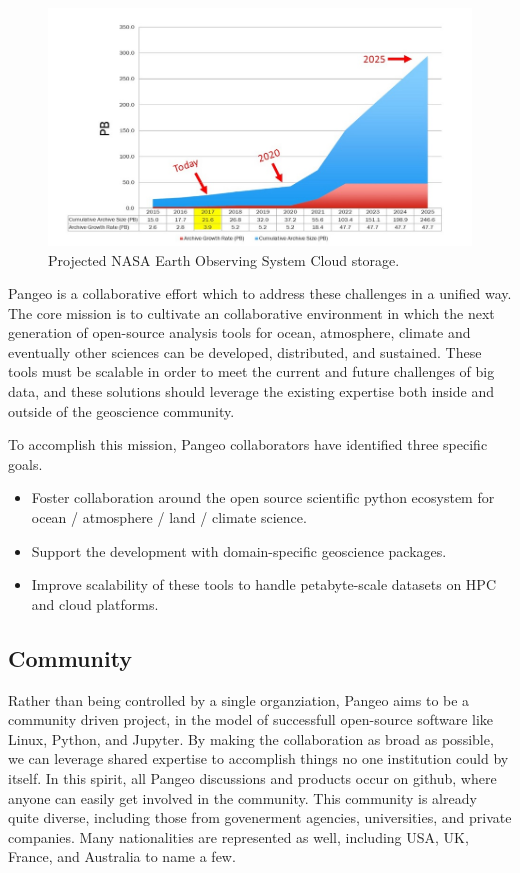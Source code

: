 \documentclass{article}
\begin{document}
\begin{figure}
  \centering
  \includegraphics[width=\columnwidth]{EOSDIS_archive_growth_updated_resize.jpg}
  \caption{\label{nasa_cloud_growth} Projected NASA Earth Observing System Cloud storage\cite{b2}.}
\end{figure}


Pangeo is a collaborative effort which to address these challenges in a unified way.
The core mission is to cultivate an collaborative environment in which the next generation of open-source analysis tools for ocean, atmosphere, climate and eventually other sciences can be developed, distributed, and sustained. These tools must be scalable in order to meet the current and future challenges of big data, and these solutions should leverage the existing expertise both inside and outside of the geoscience community.

To accomplish this mission, Pangeo collaborators have identified three specific goals.
\begin{itemize}
\item Foster collaboration around the open source scientific python ecosystem for ocean / atmosphere / land / climate science.
\item Support the development with domain-specific geoscience packages.
\item Improve scalability of these tools to handle petabyte-scale datasets on HPC and cloud platforms.
\end{itemize}

\subsection{Community}
\label{ssec:community}

Rather than being controlled by a single organziation, Pangeo aims to be a community driven project, in the model of successfull open-source software like Linux, Python, and Jupyter. By making the collaboration as broad as possible, we can leverage shared expertise to accomplish things no one institution could by itself. In this spirit, all Pangeo discussions and products occur on github\cite{b3}, where anyone can easily get involved in the community.
This community is already quite diverse, including those from govenerment agencies, universities, and private companies. Many nationalities are represented as well, including USA, UK, France, and Australia to name a few.
\end{document}

